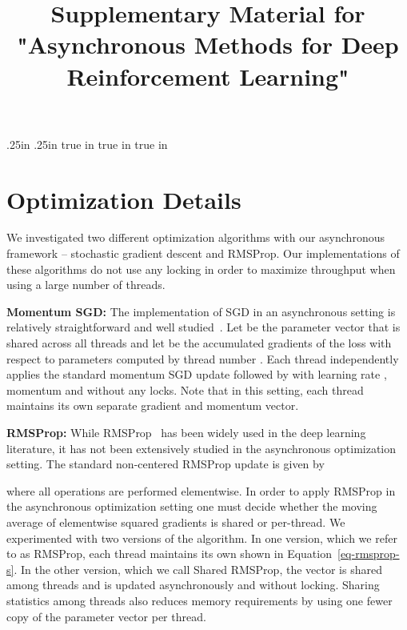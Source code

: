 \documentclass{article} \usepackage{times}
\begin{document}
\clearpage

\renewcommand{\thealgorithm}{S\arabic{algorithm}}
\renewcommand{\thefigure}{S\arabic{figure}}
\renewcommand{\theequation}{S\arabic{equation}}
\renewcommand{\thetable}{S\arabic{table}}

\oddsidemargin .25in    \evensidemargin .25in
 true in
\topmargin -0.5in
\addtolength{\headsep}{0.25in}
 true in        true in        \onecolumn
\title{Supplementary Material for "Asynchronous Methods for Deep Reinforcement Learning"}
\maketitle
\thispagestyle{empty}

\label{supplementary}

\section{Optimization Details}
\label{sec:opt}
We investigated two different optimization algorithms with our asynchronous framework -- stochastic gradient descent and RMSProp.  Our implementations of these algorithms do not use any locking in order to maximize throughput when using a large number of threads.

\textbf{Momentum SGD:}
The implementation of SGD in an asynchronous setting is relatively straightforward and well studied~\citep{recht2011hogwild}.
Let  be the parameter vector that is shared across all threads and let  be the accumulated gradients of the loss with respect to parameters  computed by thread number .
Each thread  independently applies the standard momentum SGD update  followed by  with learning rate , momentum  and without any locks.
Note that in this setting, each thread maintains its own separate gradient and momentum vector.

\textbf{RMSProp:} While RMSProp~\citep{tieleman2012lecture} has been widely used in the deep learning literature, it has not been extensively studied in the asynchronous optimization setting.  The standard non-centered RMSProp update is given by

where all operations are performed elementwise.
In order to apply RMSProp in the asynchronous optimization setting one must decide whether the moving average of elementwise squared gradients  is shared or per-thread.
We experimented with two versions of the algorithm.
In one version, which we refer to as RMSProp, each thread maintains its own  shown in Equation~\ref{eq-rmsprop-s}.
In the other version, which we call Shared RMSProp, the vector  is shared among threads and is updated asynchronously and without locking.
Sharing statistics among threads also reduces memory requirements by using one fewer copy of the parameter vector per thread.
\end{document}
